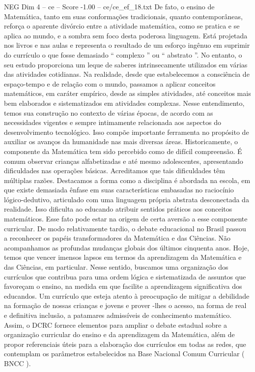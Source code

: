 \begin{textsample}{NEG Dim 4 – ce – Score -1.00 – ce/ce\_ef\_18.txt}
De fato, o ensino de Matemática, tanto em suas conformações tradicionais, quanto contemporâneas, reforça o aparente divórcio entre a atividade matemática, como se pratica e se aplica ao mundo, e a sombra sem foco desta poderosa linguagem.
Está projetada nos livros e nas aulas e representa o resultado de um esforço ingênuo em suprimir do currículo o que fosse demasiado “ complexo ” ou “ abstrato ”.
No entanto, o seu estudo proporciona um leque de saberes intrinsecamente utilizados em várias das atividades cotidianas.
Na realidade, desde que estabelecemos a consciência de espaço-tempo e de relação com o mundo, passamos a aplicar conceitos matemáticos, em caráter empírico, desde as simples atividades, até conceitos mais bem elaborados e sistematizados em atividades complexas.
Nesse entendimento, temos sua construção no contexto de várias épocas, de acordo com as necessidades vigentes e sempre intimamente relacionada aos aspectos do desenvolvimento tecnológico.
Isso compõe importante ferramenta no propósito de auxiliar os avanços da humanidade nas mais diversas áreas.
Historicamente, o componente da Matemática tem sido percebido como de difícil compreensão.
É comum observar crianças alfabetizadas e até mesmo adolescentes, apresentando dificuldades nas operações básicas.
Acreditamos que tais dificuldades têm múltiplas razões.
Destacamos a forma como a disciplina é abordada na escola, em que existe demasiada ênfase em suas características embasadas no raciocínio lógico-dedutivo, articulado com uma linguagem própria abstrata desconectada da realidade.
Isso dificulta ao educando atribuir sentidos práticos aos conceitos matemáticos.
Esse fato pode estar na origem de certa aversão a esse componente curricular.
De modo relativamente tardio, o debate educacional no Brasil passou a reconhecer os papéis transformadores da Matemática e das Ciências.
Não acompanhamos as profundas mudanças globais dos últimos cinquenta anos.
Hoje, temos que vencer imensos lapsos em termos da aprendizagem da Matemática e das Ciências, em particular.
Nesse sentido, buscamos uma organização dos currículos que contribua para uma ordem lógica e sistematizada de assuntos que favoreçam o ensino, na medida em que facilite a aprendizagem significativa dos educandos.
Um currículo que esteja atento à preocupação de mitigar a debilidade na formação de nossas crianças e jovens e prover -lhes o acesso, na forma de real e definitiva inclusão, a patamares admissíveis de conhecimento matemático.
Assim, o DCRC fornece elementos para ampliar o debate estadual sobre a organização curricular do ensino e da aprendizagem da Matemática, além de propor referenciais úteis para a elaboração dos currículos em todas as redes, que contemplam os parâmetros estabelecidos na Base Nacional Comum Curricular ( BNCC ).

\end{textsample}
